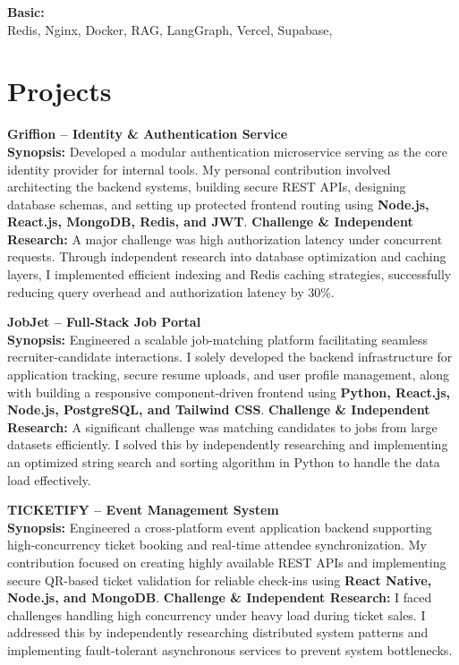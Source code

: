 \documentclass[a4paper,10pt]{article}
\begin{document}
\vspace{4pt}
\textbf{Basic:}\\[2pt]
Redis, Nginx, Docker, RAG, LangGraph, Vercel, Supabase,

\section*{Projects}

\textbf{Griffion -- Identity \& Authentication Service}\\
\textbf{Synopsis:} Developed a modular authentication microservice serving as the core identity provider for internal tools. My personal contribution involved architecting the backend systems, building secure REST APIs, designing database schemas, and setting up protected frontend routing using \textbf{Node.js, React.js, MongoDB, Redis, and JWT}. \textbf{Challenge \& Independent Research:} A major challenge was high authorization latency under concurrent requests. Through independent research into database optimization and caching layers, I implemented efficient indexing and Redis caching strategies, successfully reducing query overhead and authorization latency by 30\%.

\vspace{6pt}

\textbf{JobJet -- Full-Stack Job Portal}\\
\textbf{Synopsis:} Engineered a scalable job-matching platform facilitating seamless recruiter-candidate interactions. I solely developed the backend infrastructure for application tracking, secure resume uploads, and user profile management, along with building a responsive component-driven frontend using \textbf{Python, React.js, Node.js, PostgreSQL, and Tailwind CSS}. \textbf{Challenge \& Independent Research:} A significant challenge was matching candidates to jobs from large datasets efficiently. I solved this by independently researching and implementing an optimized string search and sorting algorithm in Python to handle the data load effectively.

\vspace{6pt}

\textbf{TICKETIFY -- Event Management System}\\
\textbf{Synopsis:} Engineered a cross-platform event application backend supporting high-concurrency ticket booking and real-time attendee synchronization. My contribution focused on creating highly available REST APIs and implementing secure QR-based ticket validation for reliable check-ins using \textbf{React Native, Node.js, and MongoDB}. \textbf{Challenge \& Independent Research:} I faced challenges handling high concurrency under heavy load during ticket sales. I addressed this by independently researching distributed system patterns and implementing fault-tolerant asynchronous services to prevent system bottlenecks.
\end{document}
